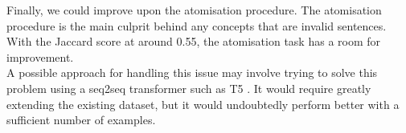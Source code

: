Finally, we could improve upon the atomisation procedure.
The atomisation procedure is the main culprit behind any concepts that are invalid sentences.
With the Jaccard score at around 0.55, the atomisation task has a room for improvement. \\
A possible approach for handling this issue may involve trying to solve this problem using a seq2seq transformer such as T5 \cite{RefWorks:RefID:88-raffel2020exploring}.
It would require greatly extending the existing dataset, but it would undoubtedly perform better with a sufficient number of examples.
